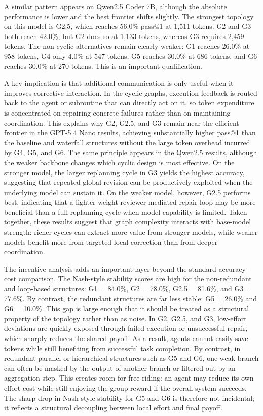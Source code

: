 \documentclass[manuscript,screen,review]{acmart}
\begin{document}
A similar pattern appears on Qwen2.5 Coder 7B, although the absolute performance is lower and the best frontier shifts slightly. The strongest topology on this model is G2.5, which reaches 56.0\% pass@1 at 1,511 tokens. G2 and G3 both reach 42.0\%, but G2 does so at 1,133 tokens, whereas G3 requires 2,459 tokens. The non-cyclic alternatives remain clearly weaker: G1 reaches 26.0\% at 958 tokens, G4 only 4.0\% at 547 tokens, G5 reaches 30.0\% at 686 tokens, and G6 reaches 30.0\% at 270 tokens. This is an important qualification.

A key implication is that additional communication is only useful when it improves corrective interaction. In the cyclic graphs, execution feedback is routed back to the agent or subroutine that can directly act on it, so token expenditure is concentrated on repairing concrete failures rather than on maintaining coordination. This explains why G2, G2.5, and G3 remain near the efficient frontier in the GPT-5.4 Nano results, achieving substantially higher pass@1 than the baseline and waterfall structures without the large token overhead incurred by G4, G5, and G6. The same principle appears in the Qwen2.5 results, although the weaker backbone changes which cyclic design is most effective. On the stronger model, the larger replanning cycle in G3 yields the highest accuracy, suggesting that repeated global revision can be productively exploited when the underlying model can sustain it. On the weaker model, however, G2.5 performs best, indicating that a lighter-weight reviewer-mediated repair loop may be more beneficial than a full replanning cycle when model capability is limited. Taken together, these results suggest that graph complexity interacts with base-model strength: richer cycles can extract more value from stronger models, while weaker models benefit more from targeted local correction than from deeper coordination.

The incentive analysis adds an important layer beyond the standard accuracy–cost comparison. The Nash-style stability scores are high for the non-redundant and loop-based structures: G1 = 84.0\%, G2 = 78.0\%, G2.5 = 81.6\%, and G3 = 77.6\%. By contrast, the redundant structures are far less stable: G5 = 26.0\% and G6 = 10.0\%. This gap is large enough that it should be treated as a structural property of the topology rather than as noise. In G2, G2.5, and G3, low-effort deviations are quickly exposed through failed execution or unsuccessful repair, which sharply reduces the shared payoff. As a result, agents cannot easily save tokens while still benefiting from successful task completion. By contrast, in redundant parallel or hierarchical structures such as G5 and G6, one weak branch can often be masked by the output of another branch or filtered out by an aggregation step. This creates room for free-riding: an agent may reduce its own effort cost while still enjoying the group reward if the overall system succeeds. The sharp drop in Nash-style stability for G5 and G6 is therefore not incidental; it reflects a structural decoupling between local effort and final payoff.
\end{document}
